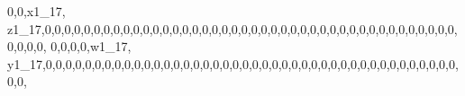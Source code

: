 \documentclass[]{article}
\newenvironment{Shaded}{\begin{snugshade}}{\end{snugshade}}
\newcommand{\DecValTok}[1]{\textcolor[rgb]{0.00,0.00,0.81}{#1}}
\newcommand{\NormalTok}[1]{#1}
\begin{document}
\begin{Shaded}
\begin{Highlighting}[]
\DecValTok{0}\NormalTok{,}\DecValTok{0}\NormalTok{,x1_}\DecValTok{17}\NormalTok{, z1_}\DecValTok{17}\NormalTok{,}\DecValTok{0}\NormalTok{,}\DecValTok{0}\NormalTok{,}\DecValTok{0}\NormalTok{,}\DecValTok{0}\NormalTok{,}\DecValTok{0}\NormalTok{,}\DecValTok{0}\NormalTok{,}\DecValTok{0}\NormalTok{,}\DecValTok{0}\NormalTok{,}\DecValTok{0}\NormalTok{,}\DecValTok{0}\NormalTok{,}\DecValTok{0}\NormalTok{,}\DecValTok{0}\NormalTok{,}\DecValTok{0}\NormalTok{,}\DecValTok{0}\NormalTok{,}\DecValTok{0}\NormalTok{,}\DecValTok{0}\NormalTok{,}\DecValTok{0}\NormalTok{,}\DecValTok{0}\NormalTok{,}\DecValTok{0}\NormalTok{,}\DecValTok{0}\NormalTok{,}\DecValTok{0}\NormalTok{,}\DecValTok{0}\NormalTok{,}\DecValTok{0}\NormalTok{,}\DecValTok{0}\NormalTok{,}\DecValTok{0}\NormalTok{,}\DecValTok{0}\NormalTok{,}\DecValTok{0}\NormalTok{,}\DecValTok{0}\NormalTok{,}\DecValTok{0}\NormalTok{,}\DecValTok{0}\NormalTok{,}\DecValTok{0}\NormalTok{,}\DecValTok{0}\NormalTok{,}\DecValTok{0}\NormalTok{,}\DecValTok{0}\NormalTok{,}\DecValTok{0}\NormalTok{,}\DecValTok{0}\NormalTok{,}\DecValTok{0}\NormalTok{,}\DecValTok{0}\NormalTok{,}\DecValTok{0}\NormalTok{,}\DecValTok{0}\NormalTok{,}\DecValTok{0}\NormalTok{,}\DecValTok{0}\NormalTok{,}\DecValTok{0}\NormalTok{,}\DecValTok{0}\NormalTok{,}\DecValTok{0}\NormalTok{,}\DecValTok{0}\NormalTok{,}
\DecValTok{0}\NormalTok{,}\DecValTok{0}\NormalTok{,}\DecValTok{0}\NormalTok{,}\DecValTok{0}\NormalTok{,w1_}\DecValTok{17}\NormalTok{, y1_}\DecValTok{17}\NormalTok{,}\DecValTok{0}\NormalTok{,}\DecValTok{0}\NormalTok{,}\DecValTok{0}\NormalTok{,}\DecValTok{0}\NormalTok{,}\DecValTok{0}\NormalTok{,}\DecValTok{0}\NormalTok{,}\DecValTok{0}\NormalTok{,}\DecValTok{0}\NormalTok{,}\DecValTok{0}\NormalTok{,}\DecValTok{0}\NormalTok{,}\DecValTok{0}\NormalTok{,}\DecValTok{0}\NormalTok{,}\DecValTok{0}\NormalTok{,}\DecValTok{0}\NormalTok{,}\DecValTok{0}\NormalTok{,}\DecValTok{0}\NormalTok{,}\DecValTok{0}\NormalTok{,}\DecValTok{0}\NormalTok{,}\DecValTok{0}\NormalTok{,}\DecValTok{0}\NormalTok{,}\DecValTok{0}\NormalTok{,}\DecValTok{0}\NormalTok{,}\DecValTok{0}\NormalTok{,}\DecValTok{0}\NormalTok{,}\DecValTok{0}\NormalTok{,}\DecValTok{0}\NormalTok{,}\DecValTok{0}\NormalTok{,}\DecValTok{0}\NormalTok{,}\DecValTok{0}\NormalTok{,}\DecValTok{0}\NormalTok{,}\DecValTok{0}\NormalTok{,}\DecValTok{0}\NormalTok{,}\DecValTok{0}\NormalTok{,}\DecValTok{0}\NormalTok{,}\DecValTok{0}\NormalTok{,}\DecValTok{0}\NormalTok{,}\DecValTok{0}\NormalTok{,}\DecValTok{0}\NormalTok{,}\DecValTok{0}\NormalTok{,}\DecValTok{0}\NormalTok{,}\DecValTok{0}\NormalTok{,}\DecValTok{0}\NormalTok{,}\DecValTok{0}\NormalTok{,}\DecValTok{0}\NormalTok{,}

\end{Highlighting}
\end{Shaded}
\end{document}
